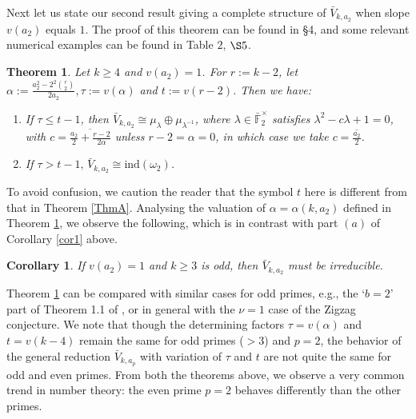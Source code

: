 \documentclass[11pt, reqno]{amsart}
\numberwithin{equation}{section}
\newcommand\ind{\mathrm{ind}}
\newcommand{\F}{\mathbb{F}}
\newtheorem{theorem}[thm]{Theorem}
\newtheorem{cor}[thm]{Corollary}
\theoremstyle{definition}
\theoremstyle{remark}
\theoremstyle{definition}
\theoremstyle{remark}
\theoremstyle{remark}
\begin{document}
        Next let us state our second result giving a complete structure of $\bar V_{k,a_2}$ when slope $v(a_2)$ equals $1$. The proof of this theorem can be found in \S4, and some relevant numerical examples can be found in Table $2$, $\S5$.
\begin{theorem}\label{ThmB}
   Let $k\geq4$ and $v(a_{2})=1$. For $r:=k-2$, let
    $\alpha := \frac{a_{2}^2-2^2{r \choose 2}}{2a_{2}}, \tau:= v(\alpha)$ and  $t:=v(r-2)$. Then we have: %
    \begin{enumerate}
        \item If $\tau\leq t-1$, then $\bar{V}_{k,a_{2}} \cong \mu_{\lambda}\oplus \mu_{\lambda^{-1}}$, where $\lambda \in \bar{\F}_{2}^{\times}$ satisfies $\lambda^2-c\lambda + 1=0$, \\with $c = \overline{\frac{a_{2}}{2} + \frac{r-2}{2\alpha}}$ unless $r-2=\alpha=0$, in which case we take $c=\overline{\frac{a_2}{2}}$.
        \item If $\tau>t-1, \,\bar{V}_{k,a_{2}} \cong \ind(\omega_{2})$.
    \end{enumerate}
\end{theorem}
To avoid confusion, we caution the reader that the symbol $t$ here is different from that in Theorem \ref{ThmA}. Analysing the valuation of $\alpha=\alpha(k,a_2)$ defined in Theorem \ref{ThmB}, we observe the following, which is in contrast with part $(a)$ of Corollary \ref{cor1} above.
\begin{cor}\label{cor2}
    If $v(a_2)=1$ and $k\geq 3$ is odd, then $\bar V_{k,a_2}$ must be irreducible.
\end{cor}
Theorem \ref{ThmB} can be compared with similar cases for odd primes, e.g., the `$b=2$' part of Theorem 1.1 of \cite{Bhattacharya-Ghate-Rozensztajn18}, or in general with the $\nu=1$ case of the Zigzag conjecture. We note that though the determining factors $\tau=v(\alpha)$  and $t=v(k-4)$ remain the same for odd primes ($>3$) and  $p=2$, the behavior of the general reduction $\bar V_{k,a_p}$ with variation of $\tau $ and $t$ are not quite the same for odd and even primes.  From both the theorems above, we observe a very common trend in number theory: the even prime $p=2$ behaves  differently than the other primes.
\end{document}
